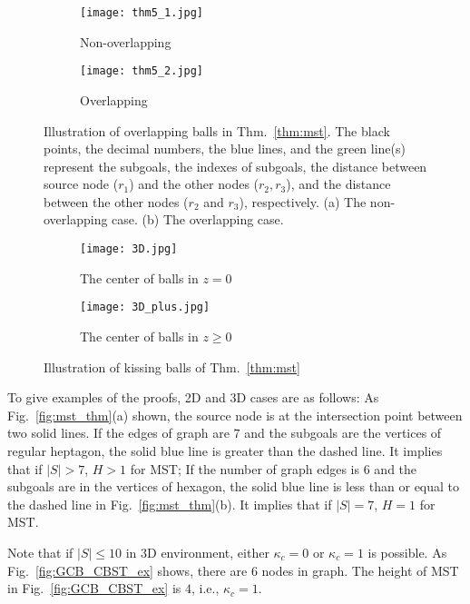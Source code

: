 \begin{figure}[htbp]
  \centering
  \begin{subfigure}{.4\textwidth}
  \centering
  \texttt{[image: thm5\_1.jpg]}
  \caption{Non-overlapping}
\end{subfigure}
\begin{subfigure}{.4\textwidth}
  \centering
  \texttt{[image: thm5\_2.jpg]}
  \caption{Overlapping}
\end{subfigure}
  \caption{Illustration of overlapping balls in Thm.~\ref{thm:mst}.
  The black points, the decimal numbers, the blue lines, and the green line(s) represent the subgoals, the indexes of subgoals, the distance between source node ($r_1$) and the other nodes ($r_2, r_3$), and the distance between the other nodes ($r_2$ and $r_3$), respectively.
  (a) The non-overlapping case.
  (b) The overlapping case.
  }
  \label{fig:mst_thm_overlapping}
\end{figure}

\begin{figure}[htbp]
  \centering
  \begin{subfigure}{.4\textwidth}
  \centering
  \texttt{[image: 3D.jpg]}
  \caption{The center of balls in $z=0$}
\end{subfigure}
\begin{subfigure}{.4\textwidth}
  \centering
  \texttt{[image: 3D\_plus.jpg]}
  \caption{The center of balls in $z\ge 0$}
\end{subfigure}
  \caption{Illustration of kissing balls of Thm.~\ref{thm:mst}}
  \label{fig:mst_thm_3D}
\end{figure}

To give examples of the proofs, 2D and 3D cases are as follows:
As Fig.~\ref{fig:mst_thm}(a) shown, the source node is at the intersection point between two solid lines.
If the edges of graph are $7$ and the subgoals are the vertices of regular heptagon, the solid blue line is greater than the dashed line.
It implies that if $|S| > 7$, $H>1$ for MST;
If the number of graph edges is $6$ and the subgoals are in the vertices of hexagon,
the solid blue line is less than or equal to the dashed line in Fig.~\ref{fig:mst_thm}(b).
It implies that if $|S| = 7$, $H=1$ for MST.

Note that if $|S|\le 10$ in 3D environment, either $\kappa_c = 0$ or $\kappa_c = 1$ is possible.
As Fig.~\ref{fig:GCB_CBST_ex} shows, there are $6$ nodes in graph.
The height of MST in Fig.~\ref{fig:GCB_CBST_ex} is $4$, i.e., $\kappa_c = 1$.

